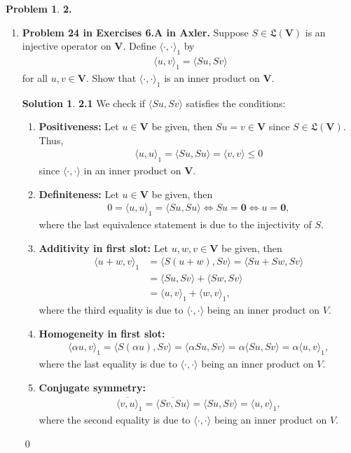 \documentclass{article}
\theoremstyle{definition}
\newtheorem*{prob*}{Problem}
\newtheorem*{sln*}{Solution}
\newcommand{\V}{\mathbf{V}}
\newcommand{\LL}{\mathfrak{L}}
\newcommand{\la}{\langle}
\newcommand{\ra}{\rangle}
\begin{document}
\begin{prob*}\textbf{2.} 
	\begin{enumerate}
		\item \textbf{Problem 24 in Exercises 6.A in Axler.} Suppose $S \in \LL(\V)$ is an injective operator on $\V$. Define $\la \cdot , \cdot \ra_1$ by 
		\begin{align*}
		\la u , v\ra_1 = \la Su, Sv \ra
		\end{align*}  
		for all $u,v\in \V$. Show that $\la \cdot , \cdot \ra_1$ is an inner product on $\V$. 
		
		
		
		\begin{sln*}\textbf{2.1} 
			We check if $\la Su, Sv \ra$ satisfies the conditions:
			\begin{enumerate}
				\item \textbf{Positiveness: }Let $u \in \V$ be given, then $Su = v \in \V$ since $S \in \LL(\V)$. Thus,
				\begin{align*}
				\la u,u \ra_1 = \la Su ,Su \ra = \la v,v \ra \leq 0
				\end{align*}
				since $\la \cdot, \cdot \ra$ in an inner product on $\V$.
				
				\item \textbf{Definiteness: }Let $u\in \V$ be given, then
				\begin{align*}
				0 = \la u,u \ra_1 = \la Su ,Su \ra \iff Su = \mathbf{0} \iff u = \mathbf{0},
				\end{align*}
				where the last equivalence statement is due to the injectivity of $S$. 
				
				\item \textbf{Additivity in first slot: }Let $u,w,v \in \V$ be given, then 
				\begin{align*}
				\la u+w ,v \ra_1 &= \la S(u+w), Sv \ra = \la Su + Sw , Sv \ra \\
				&= \la Su, Sv \ra + \la Sw, Sv \ra \\
				&= \la u,v \ra_1 + \la w,v \ra_1,
				\end{align*}
				where the third equality is due to $\la \cdot, \cdot \ra$ being an inner product on $V$.
				\item \textbf{Homogeneity in first slot: }
				\begin{align*}
				\la \alpha u,v \ra_1 = \la S(\alpha u), Sv \ra = \la \alpha Su, Sv \ra = \alpha \la Su, Sv\ra = \alpha\la u,v\ra_1,
				\end{align*}
				where the last equality is due to $\la \cdot, \cdot \ra$ being an inner product on $V$.
				\item \textbf{Conjugate symmetry: }
				\begin{align*}
				\overline{\la v,u \ra}_1 = \overline{\la Sv, Su \ra} = \la Su, Sv \ra = \la u ,v\ra_1, 
				\end{align*}
				where the second equality is due to $\la \cdot, \cdot \ra$ being an inner product on $V$.
			\end{enumerate}\qed
		\end{sln*}
		

\end{enumerate}
\end{prob*}
\end{document}
